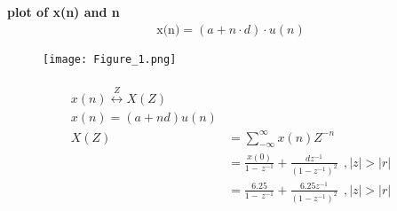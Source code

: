 \documentclass[journal,12pt,twocolumn]{IEEEtran}
\theoremstyle{remark}
\begin{document}
\textbf{plot of x(n) and n}
\begin{align}
    \text{{x(n)}}=(a+n \cdot d ) \cdot u(n)
\end{align}
\begin{figure}[h]
    \renewcommand\thefigure{1}
    \centering
    \captionsetup{justification=centering}
    \texttt{[image: Figure\_1.png]}
    \caption{}
    \label{stemplot2}
\end{figure}\begin{align}
\\x(n)\overset{Z}{\longleftrightarrow}  X(Z)
\\x(n)=(a+nd)u(n)
\\X(Z)&=\sum_{-\infty}^{\infty}x(n)Z^{-n}\
\\&=\frac{x(0)}{1-\,z^{-1}}+\frac{dz^{-1}}{({1-{z^{-1}}})^2}\:\:,|z|>|r|
\\&=\frac{6.25}{1-\,z^{-1}}+\frac{6.25z^{-1}}{({1-{z^{-1}}})^2}\:\:,|z|>|r|
\end{align}
 
\end{document}
